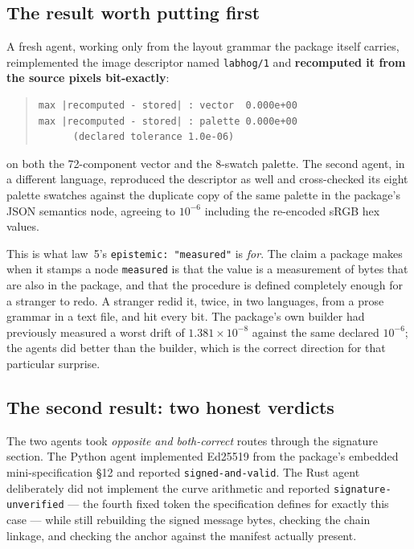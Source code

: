 \documentclass[10pt,twocolumn,letterpaper]{article}
\newcommand{\code}[1]{\texttt{\small #1}}
\begin{document}
\subsection{The result worth putting first}

A fresh agent, working only from the layout grammar the package itself carries,
reimplemented the image descriptor named \code{labhog/1} and \textbf{recomputed it
from the source pixels bit-exactly}:

\begin{quote}\small
\begin{verbatim}
max |recomputed - stored| : vector  0.000e+00
max |recomputed - stored| : palette 0.000e+00
      (declared tolerance 1.0e-06)
\end{verbatim}
\end{quote}

\noindent on both the 72-component vector and the 8-swatch palette. The second
agent, in a different language, reproduced the descriptor as well and
cross-checked its eight palette swatches against the duplicate copy of the same
palette in the package's JSON semantics node, agreeing to $10^{-6}$ including the
re-encoded sRGB hex values.

This is what law~5's \code{epistemic: "measured"} is \emph{for}. The claim a
package makes when it stamps a node \code{measured} is that the value is a
measurement of bytes that are also in the package, and that the procedure is
defined completely enough for a stranger to redo. A stranger redid it, twice, in
two languages, from a prose grammar in a text file, and hit every bit. The
package's own builder had previously measured a worst drift of $1.381\times10^{-8}$
against the same declared $10^{-6}$; the agents did better than the builder,
which is the correct direction for that particular surprise.

\subsection{The second result: two honest verdicts}

The two agents took \emph{opposite and both-correct} routes through the signature
section. The Python agent implemented Ed25519 from the package's embedded
mini-specification \S12 and reported \code{signed-and-valid}. The Rust agent
deliberately did not implement the curve arithmetic and reported
\code{signature-unverified} --- the fourth fixed token the specification defines
for exactly this case --- while still rebuilding the signed message bytes,
checking the chain linkage, and checking the anchor against the manifest actually
present.
\end{document}
